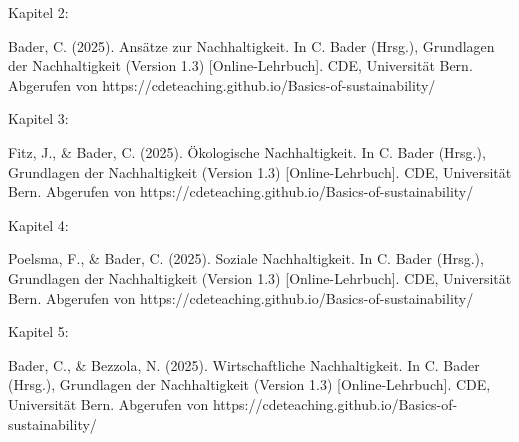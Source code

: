 \documentclass[
  nswissgerman,
  a4paper,
  DIV=11,
  numbers=noendperiod,
  oneside,
  openany]{scrreprt}
\begin{document}
Kapitel 2:

Bader, C. (2025). Ansätze zur Nachhaltigkeit. In C. Bader (Hrsg.),
Grundlagen der Nachhaltigkeit (Version 1.3) {[}Online-Lehrbuch{]}. CDE,
Universität Bern. Abgerufen von
https://cdeteaching.github.io/Basics-of-sustainability/

Kapitel 3:

Fitz, J., \& Bader, C. (2025). Ökologische Nachhaltigkeit. In C. Bader
(Hrsg.), Grundlagen der Nachhaltigkeit (Version 1.3)
{[}Online-Lehrbuch{]}. CDE, Universität Bern. Abgerufen von
https://cdeteaching.github.io/Basics-of-sustainability/

Kapitel 4:

Poelsma, F., \& Bader, C. (2025). Soziale Nachhaltigkeit. In C. Bader
(Hrsg.), Grundlagen der Nachhaltigkeit (Version 1.3)
{[}Online-Lehrbuch{]}. CDE, Universität Bern. Abgerufen von
https://cdeteaching.github.io/Basics-of-sustainability/

Kapitel 5:

Bader, C., \& Bezzola, N. (2025). Wirtschaftliche Nachhaltigkeit. In C.
Bader (Hrsg.), Grundlagen der Nachhaltigkeit (Version 1.3)
{[}Online-Lehrbuch{]}. CDE, Universität Bern. Abgerufen von
https://cdeteaching.github.io/Basics-of-sustainability/
\end{document}
